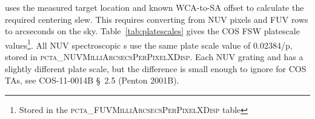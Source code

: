 uses the measured target location and known WCA-to-SA offset to calculate the required centering slew.
This requires converting from NUV pixels and FUV rows to arcseconds on the sky. Table~\ref{tab:platescales} gives the
COS FSW platescale values\footnote{Stored in the \textsc{pcta\_FUVMilliArcsecsPerPixelXDisp} table}. All NUV spectroscopic
s use the same plate scale value of 0.02384\arcsec{}/p, stored in \textsc{pcta\_NUVMilliArcsecsPerPixelXDisp}.
Each NUV grating and \cenwave{} has a slightly different plate scale, but the difference is small enough to ignore for COS TAs, see COS-11-0014B \S~{2.5} (Penton 2001B).



